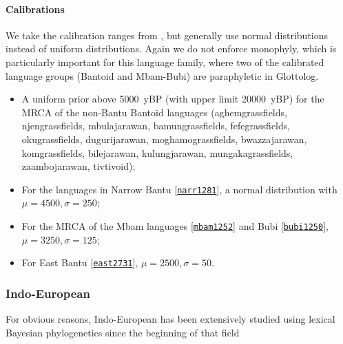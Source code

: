 \documentclass[a4paper,12pt]{scrartcl}
\newcommand{\glot}[2]{#1 {\scriptsize{[\texttt{\href{https://glottolog.org/resource/languoid/id/#2}{#2}}]}}}
\begin{document}
\paragraph{Calibrations}
We take the calibration ranges from \textcite{grollemund2015bantu}, but generally use normal distributions instead of uniform distributions. Again we do not enforce monophyly, which is particularly important for this language family, where two of the calibrated language groups (Bantoid and Mbam-Bubi) are paraphyletic in Glottolog.
\begin{itemize}
\item A uniform prior above 5000~yBP (with upper limit 20000~yBP) for the MRCA of the non-Bantu Bantoid languages (aghemgrassfields, njengrassfields, mbulajarawan, bamungrassfields, fefegrassfields, okugrassfields, dugurijarawan, moghamograssfields, bwazzajarawan, komgrassfields, bilejarawan, kulungjarawan, mungakagrassfields, zaambojarawan, tivtivoid);
\item For the languages in \glot{Narrow Bantu}{narr1281}, a normal distribution with $\mu=4500, \sigma=250$;
\item For the MRCA of the \glot{Mbam languages}{mbam1252} and \glot{Bubi}{bubi1250}, $\mu=3250, \sigma=125$;
\item For \glot{East Bantu}{east2731}, $\mu=2500, \sigma=50$.
\end{itemize}

\subsubsection{Indo-European}
For obvious reasons, Indo-European has been extensively studied using lexical Bayesian phylogenetics since the beginning
of that field
\parencite{bouckaert2012mapping,chang2015ancestryconstrained,gray2003language,holm2017steppe,rama2018three,willems2016using}
\end{document}
